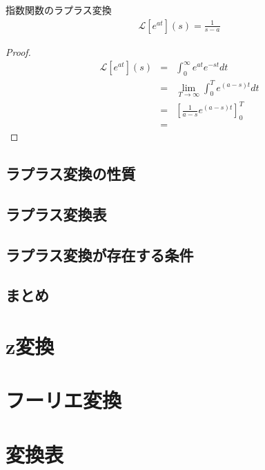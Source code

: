 \documentclass[uplatex, dvipdfmx, fleqn, a4paper, 10pt]{ujreport}
\begin{document}
\begin{exprbox}{指数関数のラプラス変換}
    \begin{eqnarray}
        \mathcal{L}[e^{at}](s) = \frac{1}{s - a}
    \end{eqnarray}
    \begin{proof}
        \begin{eqnarray*}
            \mathcal{L}[e^{at}](s) &=& \int_{0}^{\infty} e^{at} e^{-st} dt \\
            &=& \lim_{T \to \infty} \int_{0}^{T} e^{(a - s)t} dt \\
            &=& \left[\frac{1}{a - s}e^{(a - s)t}\right]_0^T \\
            &=& 
        \end{eqnarray*}
    \end{proof}
\end{exprbox}

\subsection{ラプラス変換の性質}

\subsection{ラプラス変換表}

\subsection{ラプラス変換が存在する条件}

\subsection{まとめ}

\section{z変換}\label{sec:z_transform}

\section{フーリエ変換}\label{sec:fourier_transform}

\section{変換表}

\newpage
\end{document}
